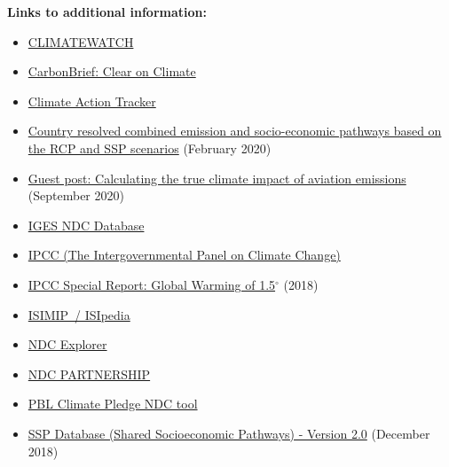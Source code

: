 \documentclass[12pt]{article}
\begin{document}
 \noindent \textbf{Links to additional information:}
 \begin{itemize}
 \item \href{https://www.climatewatchdata.org/}{CLIMATEWATCH} 
 \vspace{-.2cm} \item \href{https://www.carbonbrief.org/}{CarbonBrief: Clear on Climate} 
 \vspace{-.2cm} \item \href{https://climateactiontracker.org/}{Climate Action Tracker} 
 \vspace{-.2cm} \item \href{https://zenodo.org/record/3638137#.X2sqPIuxU2w}{Country resolved combined emission and socio-economic pathways based on the RCP and SSP scenarios} (February 2020)
 \vspace{-.2cm} \item \href{https://www.carbonbrief.org/guest-post-calculating-the-true-climate-impact-of-aviation-emissions?utm_campaign=Carbon%20Brief%20Daily%20Briefing&utm_medium=email&utm_source=Revue%20newsletter}{Guest post: Calculating the true climate impact of aviation emissions} (September 2020)
 \vspace{-.2cm} \item \href{https://www.iges.or.jp/en/pub/iges-indc-ndc-database/en}{IGES NDC Database} 
 \vspace{-.2cm} \item \href{https://www.ipcc.ch/}{IPCC (The Intergovernmental Panel on Climate Change)} 
 \vspace{-.2cm} \item \href{https://www.ipcc.ch/sr15/}{IPCC Special Report: Global Warming of 1.5$^{\circ}$} (2018)
 \vspace{-.2cm} \item \href{https://www.isimip.org/isipedia/#isipedia-portal}{ISIMIP~/ ISIpedia} 
 \vspace{-.2cm} \item \href{https://klimalog.die-gdi.de/ndc/#NDCExplorer/worldMap?NDC??income???catIncome}{NDC Explorer} 
 \vspace{-.2cm} \item \href{https://ndcpartnership.org/}{NDC PARTNERSHIP} 
 \vspace{-.2cm} \item \href{https://themasites.pbl.nl/o/climate-ndc-policies-tool/}{PBL Climate Pledge NDC tool} 
 \vspace{-.2cm} \item \href{https://tntcat.iiasa.ac.at/SspDb/dsd?Action=htmlpage&page=about}{SSP Database (Shared Socioeconomic Pathways) - Version 2.0} (December 2018)

\end{itemize}
\end{document}

